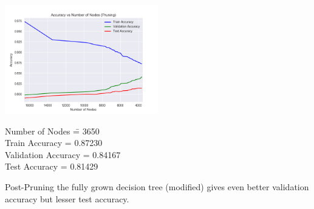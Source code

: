 \documentclass[12pt]{article}
\begin{document}
\includegraphics[width=0.5\textwidth]{dtree6.png}
\begin{addmargin}[0.3in]{0in}
\begin{tabbing}
Number of Nodes \qquad \= = 3650 \\
Train Accuracy \> = 0.87230 \\
Validation Accuracy \> = 0.84167 \\
Test Accuracy \> = 0.81429 \\
\end{tabbing}
\vspace{-3mm}
\end{addmargin}
\begin{addmargin}[0.3in]{0in}
Post-Pruning the fully grown decision tree (modified) gives even better validation accuracy but lesser test accuracy.
\end{addmargin}
\end{document}
